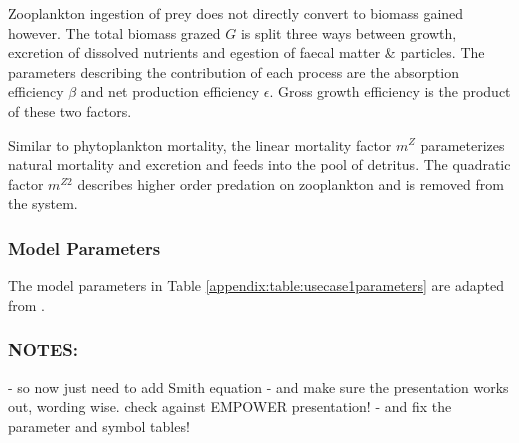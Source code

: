 \documentclass[template.tex]{subfiles}
\begin{document}
Zooplankton ingestion of prey does not directly convert to biomass gained however. The total biomass grazed $G$ is split three ways between growth, excretion of dissolved nutrients and egestion of faecal matter \& particles. The parameters describing the contribution of each process are the absorption efficiency $\beta$ and net production efficiency $\epsilon$. Gross growth efficiency is the product of these two factors.  

Similar to phytoplankton mortality, the linear mortality factor $m^Z$ parameterizes natural mortality and excretion and feeds into the pool of detritus. The quadratic factor $m^{Z2}$ describes higher order predation on zooplankton and is removed from the system.



\subsubsection{Model Parameters}
The model parameters in Table \ref{appendix:table:usecase1parameters} are adapted from \citet{Anderson2015c}.


\subsubsection{NOTES:}
- so now just need to add Smith equation
- and make sure the presentation works out, wording wise. check against EMPOWER presentation!
- and fix the parameter and symbol tables!


\clearpage
\end{document}
